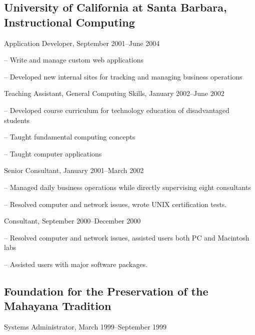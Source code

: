 \documentclass[letterpaper]{article}
\renewenvironment{itemize}{
  \begin{list}{}{
    \setlength{\leftmargin}{1.5em}
  }
}{
  \end{list}
}
\begin{document}
\subsection*{University of California at Santa Barbara, Instructional Computing}
\begin{itemize}
\item Application Developer, September 2001--June 2004
  \begin{itemize}
    \item -- Write and manage custom web applications
    \item -- Developed new internal sites for tracking and managing business operations
  \end{itemize}
\item Teaching Assistant, General Computing Skills, January 2002--June 2002
  \begin{itemize}
    \item -- Developed course curriculum for technology education of disadvantaged students
    \item -- Taught fundamental computing concepts
    \item -- Taught computer applications
  \end{itemize}
\item Senior Consultant, January 2001--March 2002
  \begin{itemize}
    \item -- Managed daily business operations while directly supervising eight consultants
    \item -- Resolved computer and network issues, wrote UNIX certification tests.
  \end{itemize} 
\item Consultant, September 2000--December 2000
  \begin{itemize}
    \item -- Resolved computer and network issues, assisted users both PC and Macintosh labs
    \item -- Assisted users with major software packages.
  \end{itemize} 
\end{itemize}

\subsection*{Foundation for the Preservation of the Mahayana Tradition}
\begin{itemize}
  \item Systems Administrator, March 1999--September 1999
\end{itemize}
\end{document}
